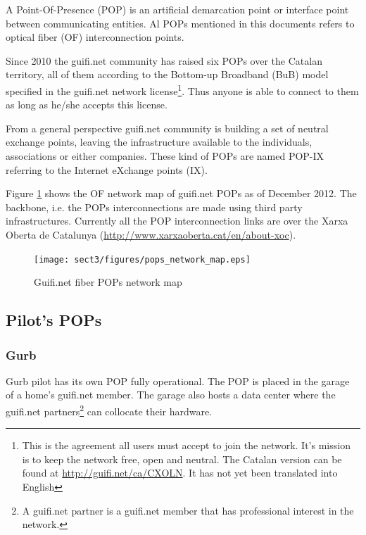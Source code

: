 A Point-Of-Presence (POP) is an artificial demarcation point or interface point between communicating entities. Al POPs mentioned in this documents refers to optical fiber (OF) interconnection points.

Since 2010 the guifi.net community has raised six POPs over the Catalan territory, all of them according to the Bottom-up Broadband (BuB) model specified in the guifi.net network license\footnote{This is the agreement all users must accept to join the network. It's mission is to keep the network free, open and neutral. The Catalan version can be found at \url{http://guifi.net/ca/CXOLN}. It has not yet been translated into English}.
Thus anyone is able to connect to them as long as he/she accepts this license.

From a general perspective guifi.net community is building a set of neutral exchange points, leaving the infrastructure available to the individuals, associations or either companies. These kind of POPs are named POP-IX referring to the Internet eXchange points (IX).

Figure \ref{fig:fibre_map} shows the OF network map of guifi.net POPs as of December 2012. The backbone, i.e. the POPs interconnections are made using third party infrastructures. Currently all the POP interconnection links are over the Xarxa Oberta de Catalunya (\url{http://www.xarxaoberta.cat/en/about-xoc}). %

\begin{figure}[htbp]
  \centering
  \texttt{[image: sect3/figures/pops\_network\_map.eps]} 
  \caption{Guifi.net fiber POPs network map}
  \label{fig:fibre_map}
\end{figure}



\FloatBarrier
\subsection{Pilot's POPs}

\FloatBarrier
\subsubsection{Gurb}
Gurb pilot has its own POP fully operational. The POP is placed in the garage of a home's guifi.net member. The garage also hosts a data center where the guifi.net partners\footnote{A guifi.net partner is a guifi.net member that has professional interest in the network.} can collocate their hardware.

